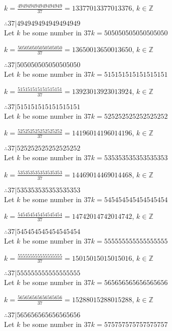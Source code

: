 \documentclass{article}
\begin{document}
$k = \frac{494949494949494949}{37} = 13377013377013376$, $k \in \mathbb{Z}$

$ \therefore  37|494949494949494949 $ \\

Let $k$ be some number in $37k = 505050505050505050$

$k = \frac{505050505050505050}{37} = 13650013650013650$, $k \in \mathbb{Z}$

$ \therefore  37|505050505050505050 $ \\

Let $k$ be some number in $37k = 515151515151515151$

$k = \frac{515151515151515151}{37} = 13923013923013924$, $k \in \mathbb{Z}$

$ \therefore  37|515151515151515151 $ \\

Let $k$ be some number in $37k = 525252525252525252$

$k = \frac{525252525252525252}{37} = 14196014196014196$, $k \in \mathbb{Z}$

$ \therefore  37|525252525252525252 $ \\

Let $k$ be some number in $37k = 535353535353535353$

$k = \frac{535353535353535353}{37} = 14469014469014468$, $k \in \mathbb{Z}$

$ \therefore  37|535353535353535353 $ \\

Let $k$ be some number in $37k = 545454545454545454$

$k = \frac{545454545454545454}{37} = 14742014742014742$, $k \in \mathbb{Z}$

$ \therefore  37|545454545454545454 $ \\

Let $k$ be some number in $37k = 555555555555555555$

$k = \frac{555555555555555555}{37} = 15015015015015016$, $k \in \mathbb{Z}$

$ \therefore  37|555555555555555555 $ \\

Let $k$ be some number in $37k = 565656565656565656$

$k = \frac{565656565656565656}{37} = 15288015288015288$, $k \in \mathbb{Z}$

$ \therefore  37|565656565656565656 $ \\

Let $k$ be some number in $37k = 575757575757575757$
\end{document}
